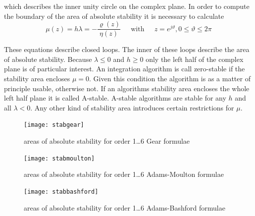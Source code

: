 \documentclass[10pt]{report}
\begin{document}
which describes the inner unity circle on the complex plane.  In order
to compute the boundary of the area of absolute stability it is
necessary to calculate
\begin{equation}
\label{eq:StabArea}
\mu\left(z\right) = h\lambda = -\dfrac{\varrho\left(z\right)}{\eta\left(z\right)}
\;\;\;\; \textrm{ with } \;\;\;\;
z = e^{j\vartheta}, 0 \le \vartheta \le 2\pi
\end{equation}

These equations describe closed loops. The inner of these loops
describe the area of absolute stability.  Because $\lambda \le 0$ and
$h \ge 0$ only the left half of the complex plane is of particular
interest.  An integration algorithm is call zero-stable if the
stability area encloses $\mu = 0$.  Given this condition the algorithm
is as a matter of principle usable, otherwise not.  If an algorithms
stability area encloses the whole left half plane it is called
A-stable.  A-stable algorithms are stable for any $h$ and all $\lambda
< 0$.  Any other kind of stability area introduces certain
restrictions for $\mu$.

\begin{figure}[ht]
\begin{center}
\texttt{[image: stabgear]}
\end{center}
\caption{areas of absolute stability for order 1\ldots 6 Gear formulae}
\label{fig:StabGear}
\end{figure}
\FloatBarrier

\begin{figure}[ht]
\begin{center}
\texttt{[image: stabmoulton]}
\end{center}
\caption{areas of absolute stability for order 1\ldots 6 Adams-Moulton formulae}
\label{fig:StabMoulton}
\end{figure}
\FloatBarrier

\begin{figure}[ht]
\begin{center}
\texttt{[image: stabbashford]}
\end{center}
\caption{areas of absolute stability for order 1\ldots 6 Adams-Bashford formulae}
\label{fig:StabBashford}
\end{figure}
\FloatBarrier
\end{document}
